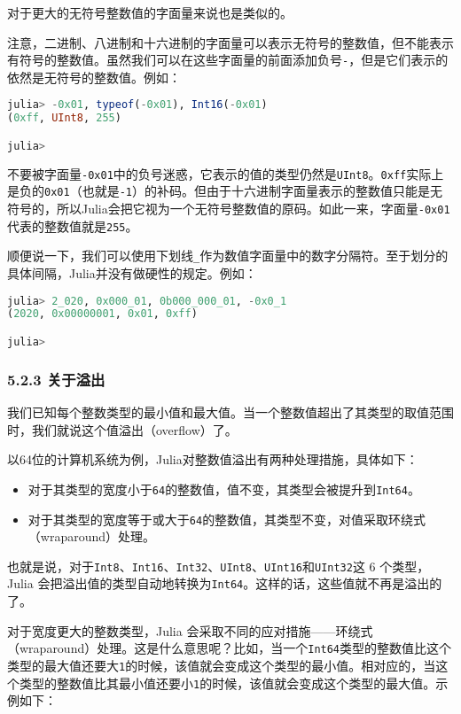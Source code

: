 对于更大的无符号整数值的字面量来说也是类似的。

注意，二进制、八进制和十六进制的字面量可以表示无符号的整数值，但不能表示有符号的整数值。虽然我们可以在这些字面量的前面添加负号\verb`-`，但是它们表示的依然是无符号的整数值。例如：

\begin{lstlisting}[language=julia]
julia> -0x01, typeof(-0x01), Int16(-0x01)
(0xff, UInt8, 255)

julia> 
\end{lstlisting}

不要被字面量\verb`-0x01`中的负号迷惑，它表示的值的类型仍然是\verb`UInt8`。\verb`0xff`实际上是负的\verb`0x01`（也就是\verb`-1`）的补码。但由于十六进制字面量表示的整数值只能是无符号的，所以Julia会把它视为一个无符号整数值的原码。如此一来，字面量\verb`-0x01`代表的整数值就是\verb`255`。

顺便说一下，我们可以使用下划线\verb`_`作为数值字面量中的数字分隔符。至于划分的具体间隔，Julia并没有做硬性的规定。例如：

\begin{lstlisting}[language=julia]
julia> 2_020, 0x000_01, 0b000_000_01, -0x0_1
(2020, 0x00000001, 0x01, 0xff)

julia> 
\end{lstlisting}

\subsubsection{5.2.3 关于溢出}

我们已知每个整数类型的最小值和最大值。当一个整数值超出了其类型的取值范围时，我们就说这个值溢出（overflow）了。

以64位的计算机系统为例，Julia对整数值溢出有两种处理措施，具体如下：

\begin{itemize}
\item 对于其类型的宽度小于\verb`64`的整数值，值不变，其类型会被提升到\verb`Int64`。
\item  对于其类型的宽度等于或大于\verb`64`的整数值，其类型不变，对值采取环绕式（wraparound）处理。
\end{itemize}

也就是说，对于\verb`Int8`、\verb`Int16`、\verb`Int32`、\verb`UInt8`、\verb`UInt16`和\verb`UInt32`这 6 个类型，Julia 会把溢出值的类型自动地转换为\verb`Int64`。这样的话，这些值就不再是溢出的了。

对于宽度更大的整数类型，Julia 会采取不同的应对措施——环绕式（wraparound）处理。这是什么意思呢？比如，当一个\verb`Int64`类型的整数值比这个类型的最大值还要大\verb`1`的时候，该值就会变成这个类型的最小值。相对应的，当这个类型的整数值比其最小值还要小\verb`1`的时候，该值就会变成这个类型的最大值。示例如下：

